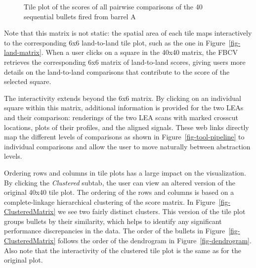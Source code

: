 \documentclass[
  number,
  preprint,
  5p,
  twocolumn]{elsarticle}
\begin{document}
\begin{figure}


\caption{\label{fig-barrel-matrix}Tile plot of the scores of all
pairwise comparisons of the 40 sequential bullets fired from barrel A}

\end{figure}%

Note that this matrix is not static: the spatial area of each tile maps
interactively to the corresponding 6x6 land-to-land tile plot, such as
the one in Figure~\ref{fig-land-matrix}. When a user clicks on a square
in the 40x40 matrix, the FBCV retrieves the corresponding 6x6 matrix of
land-to-land scores, giving users more details on the land-to-land
comparisons that contribute to the score of the selected square.

The interactivity extends beyond the 6x6 matrix. By clicking on an
individual square within this matrix, additional information is provided
for the two LEAs and their comparison: renderings of the two LEA scans
with marked crosscut locations, plots of their profiles, and the aligned
signals. These web links directly map the different levels of
comparisons as shown in Figure~\ref{fig-tool-pipeline} to individual
comparisons and allow the user to move naturally between abstraction
levels.

Ordering rows and columns in tile plots has a large impact on the
visualization. By clicking the \emph{Clustered} subtab, the user can
view an altered version of the original 40x40 tile plot. The ordering of
the rows and columns is based on a complete-linkage hierarchical
clustering of the score matrix. In Figure~\ref{fig-ClusteredMatrix} we
see two fairly distinct clusters. This version of the tile plot groups
bullets by their similarity, which helps to identify any significant
performance discrepancies in the data. The order of the bullets in
Figure~\ref{fig-ClusteredMatrix} follows the order of the dendrogram in
Figure~\ref{fig-dendrogram}. Also note that the interactivity of the
clustered tile plot is the same as for the original plot.
\end{document}
